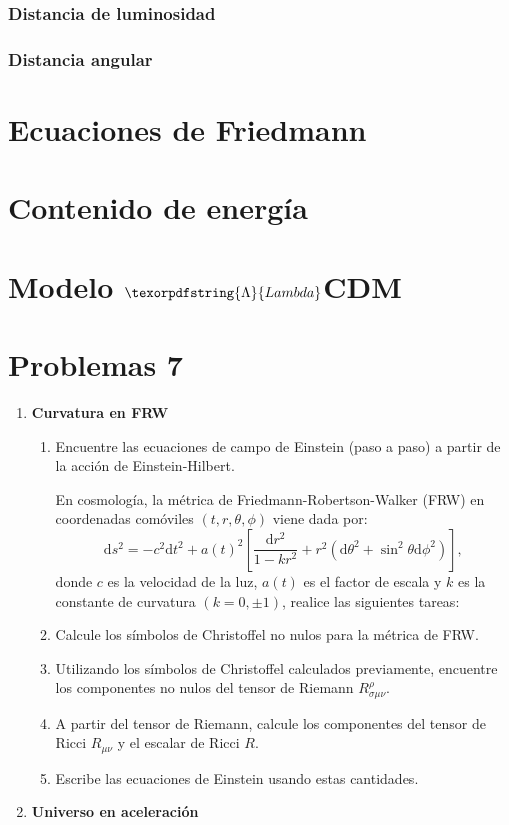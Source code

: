 \documentclass[../main]{subfiles}
\begin{document}
\begin{adjustwidth}{0pt}{-100pt}
\subsubsection{Distancia de luminosidad}

\subsubsection{Distancia angular}

\section{Ecuaciones de Friedmann}\label{part7.3}

\section{Contenido de energía}\label{part7.4}

\section{Modelo $\texorpdfstring{\Lambda}{Lambda}$CDM}\label{part7.5}

\section*{Problemas 7}
\begin{enumerate}
    \item \textbf{Curvatura en FRW}
    \begin{enumerate}[label=(\alph*)]
        \item Encuentre las ecuaciones de campo de Einstein (paso a paso) a partir de la acción de Einstein-Hilbert.
        
        En cosmología, la métrica de Friedmann-Robertson-Walker (FRW) en coordenadas comóviles $(t, r, \theta, \phi)$ viene dada por:
        \begin{equation}
            \mathrm{d}s^2=-c^2\mathrm{d}t^2+a(t)^2\left[\dfrac{\mathrm{d}r^2}{1-kr^2}+r^2(\mathrm{d}\theta^2+\sin^2 \theta \mathrm{d}\phi^2)\right],
        \end{equation}
        donde $c$ es la velocidad de la luz, $a(t)$ es el factor de escala y $k$ es la constante de curvatura $(k=0, \pm 1)$, realice las siguientes tareas:
        \item Calcule los símbolos de Christoffel no nulos para la métrica de FRW.
        \item Utilizando los símbolos de Christoffel calculados previamente, encuentre los componentes no nulos del tensor de Riemann $R^{\rho}_{\sigma\mu\nu}$.
        \item A partir del tensor de Riemann, calcule los componentes del tensor de Ricci $R_{\mu\nu}$ y el escalar de Ricci $R$.
        \item Escribe las ecuaciones de Einstein usando estas cantidades.
    \end{enumerate}
    \item \textbf{Universo en aceleración}
    

\end{enumerate}
\end{adjustwidth}
\end{document}
